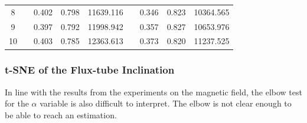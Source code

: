 \begin{table}[]
\begin{tabular}{@{}ccccccccc@{}}
8                    &                      & 0.402            & 0.798       & 11639.116   &                      & 0.346            & 0.823       & 10364.565   \\
9                    &                      & 0.397            & 0.792       & 11998.942   &                      & 0.357            & 0.827       & 10653.976   \\
10                   &                      & 0.403            & 0.785       & 12363.613   &                      & 0.373            & 0.820       & 11237.525   \\ \bottomrule
\end{tabular}
\end{table}

\subsubsection{t-SNE of the Flux-tube Inclination}\label{sec:tsne_a}
In line with the results from the experiments on the magnetic field, the elbow test for the $\alpha$ variable is also difficult to interpret. The elbow is not clear enough to be able to reach an estimation.

